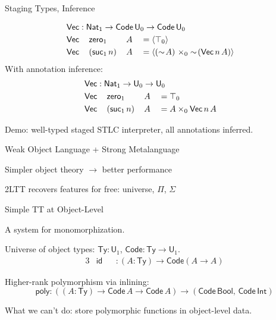 \documentclass[dvipsnames,10pt,aspectratio=169]{beamer}
\newcommand{\Ty}{\mathsf{Ty}}
\renewcommand{\U}{\mathsf{U}}
\newcommand{\Nat}{\mathsf{Nat}}
\newcommand{\Bool}{\mathsf{Bool}}
\newcommand{\Code}{\mathsf{Code}}
\newcommand{\msf}[1]{\mathsf{#1}}
\newcommand{\qtm}[1]{\langle #1\rangle}
\begin{document}
\begin{frame}{Staging Types, Inference}

\begin{alignat*}{5}
  & \rlap{$\msf{Vec} : \Nat_1 \to \Code\,\U_0 \to \Code\,\U_0$}\\
  & \msf{Vec}\,&&\msf{zero}_1\,&&A &&= \qtm{\top_0}\\
  & \msf{Vec}\,&&(\msf{suc}_1\,n)\,&&A &&= \qtm{(\sim\!A)\,\,\times_0 \sim\!(\msf{Vec}\,n\,A)}
\end{alignat*}
\pause
With annotation inference:
\begin{alignat*}{5}
  & \rlap{$\msf{Vec} : \Nat_1 \to \U_0 \to \U_0$}\\
  & \msf{Vec}\,&&\msf{zero}_1\,&&A &&= \top_0\\
  & \msf{Vec}\,&&(\msf{suc}_1\,n)\,&&A &&= A \times_0 \msf{Vec}\,n\,A
\end{alignat*}

Demo: well-typed staged STLC interpreter, all annotations inferred.
\end{frame}

\begin{frame}{Weak Object Language + Strong Metalanguage}

Simpler object theory $\to$ better performance
\vspace{1em}

2LTT recovers features for free: universe, $\Pi$, $\Sigma$
\vspace{1em}

\end{frame}

\begin{frame}{Simple TT at Object-Level}

A system for monomorphization.
\vspace{1em}
\pause

Universe of object types: $\Ty : \U_1$, $\Code : \Ty \to \U_1$.
\begin{alignat*}{3}
  &\msf{id}  &&: (A : \Ty) \to \Code(A \to A)
\end{alignat*}
\pause


Higher-rank polymorphism via inlining:
\[ \msf{poly} : ((A : \Ty) \to \Code\,A \to \Code\,A) \to (\Code\,\Bool,\,\Code\,\msf{Int}) \]

What we can't do: store polymorphic functions in object-level data.

\end{frame}
\end{document}
